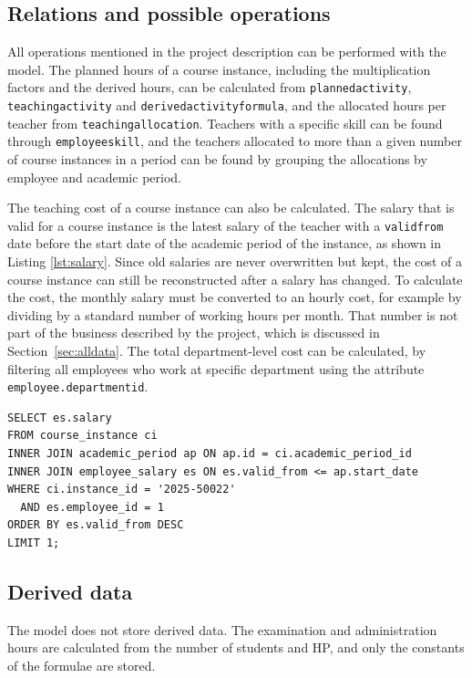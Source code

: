 \documentclass[a4paper]{scrartcl}
\renewcommand{\_}{\textunderscore\allowbreak}
\begin{document}
\subsection{Relations and possible operations}

All operations mentioned in the project description can be performed with the model. The planned hours of a course instance, including the multiplication factors and the derived hours, can be calculated from \texttt{planned\_activity}, \texttt{teaching\_activity} and \texttt{derived\_activity\_formula}, and the allocated hours per teacher from \texttt{teaching\_allocation}. Teachers with a specific skill can be found through \texttt{employee\_skill}, and the teachers allocated to more than a given number of course instances in a period can be found by grouping the allocations by employee and academic period.

The teaching cost of a course instance can also be calculated. The salary that is valid for a course instance is the latest salary of the teacher with a \texttt{valid\_from} date before the start date of the academic period of the instance, as shown in Listing \ref{lst:salary}. Since old salaries are never overwritten but kept, the cost of a course instance can still be reconstructed after a salary has changed. To calculate the cost, the monthly salary must be converted to an hourly cost, for example by dividing by a standard number of working hours per month. That number is not part of the business described by the project, which is discussed in Section~\ref{sec:alldata}. The total department-level cost can be calculated, by filtering all employees who work at specific department using the attribute \texttt{employee.department\_id}.

\begin{lstlisting}[style=sql, caption={The salary of one employee that is valid for one course instance}, label={lst:salary}]
SELECT es.salary
FROM course_instance ci
INNER JOIN academic_period ap ON ap.id = ci.academic_period_id
INNER JOIN employee_salary es ON es.valid_from <= ap.start_date
WHERE ci.instance_id = '2025-50022'
  AND es.employee_id = 1
ORDER BY es.valid_from DESC
LIMIT 1;
\end{lstlisting}

\subsection{Derived data}

The model does not store derived data. The examination and administration hours are calculated from the number of students and HP, and only the constants of the formulae are stored.
\end{document}
